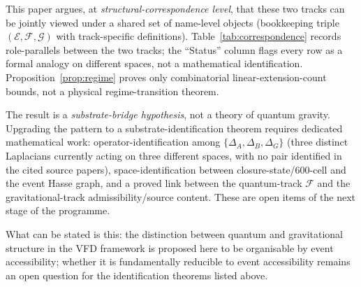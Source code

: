 \documentclass[12pt]{article}
\newcommand{\Ecal}{\mathcal{E}}
\newcommand{\Gcal}{\mathcal{G}}
\newcommand{\Fcal}{\mathcal{F}}
\begin{document}
This paper argues, at \emph{structural-correspondence level}, that these two tracks can be jointly viewed under a shared set of name-level objects (bookkeeping triple $(\Ecal, \Fcal, \Gcal)$ with track-specific definitions). Table~\ref{tab:correspondence} records role-parallels between the two tracks; the ``Status'' column flags every row as a formal analogy on different spaces, not a mathematical identification. Proposition~\ref{prop:regime} proves only combinatorial linear-extension-count bounds, not a physical regime-transition theorem.

The result is a \emph{substrate-bridge hypothesis}, not a theory of quantum gravity. Upgrading the pattern to a substrate-identification theorem requires dedicated mathematical work: operator-identification among $\{\Delta_A, \Delta_B, \Delta_G\}$ (three distinct Laplacians currently acting on three different spaces, with no pair identified in the cited source papers), space-identification between closure-state/600-cell and the event Hasse graph, and a proved link between the quantum-track $\Fcal$ and the gravitational-track admissibility/source content. These are open items of the next stage of the programme.

What can be stated is this: the distinction between quantum and gravitational structure in the VFD framework is proposed here to be organisable by event accessibility; whether it is fundamentally reducible to event accessibility remains an open question for the identification theorems listed above.



\end{document}
